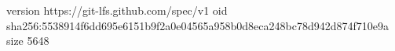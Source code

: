 version https://git-lfs.github.com/spec/v1
oid sha256:5538914f6dd695e6151b9f2a0e04565a958b0d8eca248bc78d942d874f710e9a
size 5648
